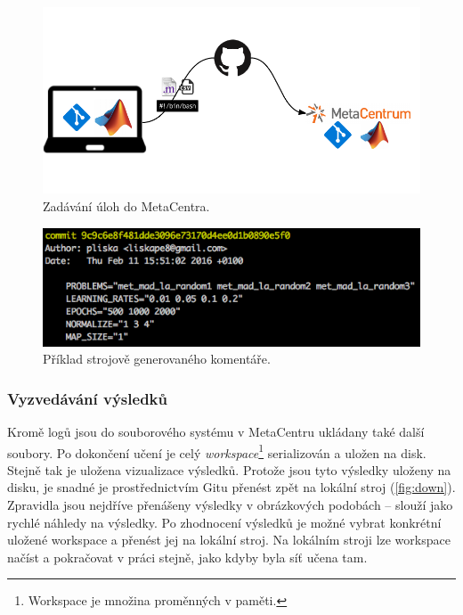 \documentclass[thesis=M,czech]{FITthesis}[2012/06/26]
\begin{document}
\begin{figure}[htbp]
\begin{center}
	\includegraphics[scale=0.9]{up.png}
\caption{Zadávání úloh do MetaCentra.}
\label{fig:up}
\end{center}
\end{figure}


\begin{figure}[htbp]
\begin{center}
	\includegraphics[scale=0.7]{semantic_commit}
\caption{Příklad strojově generovaného komentáře.}
\label{fig:semantic_commit}
\end{center}
\end{figure}



\subsubsection*{Vyzvedávání výsledků}
Kromě logů jsou do souborového systému v MetaCentru ukládany také další soubory. Po dokončení učení je celý \textit{workspace}\footnote{Workspace je množina proměnných v paměti.} serializován a uložen na disk. Stejně tak je uložena vizualizace výsledků. Protože jsou tyto výsledky uloženy na disku, je snadné je prostřednictvím Gitu přenést zpět na lokální stroj (\ref{fig:down}). Zpravidla jsou nejdříve přenášeny výsledky v obrázkových podobách -- slouží jako rychlé náhledy na výsledky. Po zhodnocení výsledků je možné vybrat konkrétní uložené workspace a přenést jej na lokální stroj. Na lokálním stroji lze workspace načíst a pokračovat v práci stejně, jako kdyby byla síť učena tam.
\end{document}
